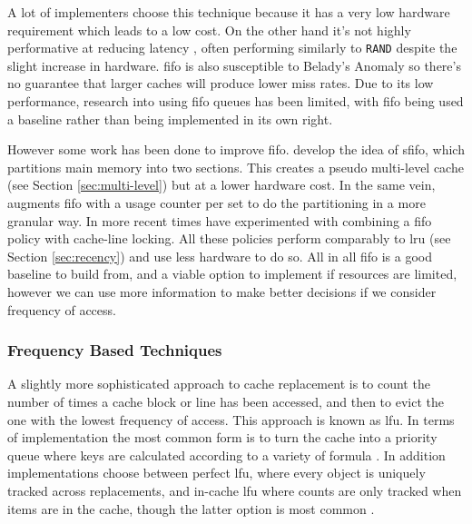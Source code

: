 A lot of implementers choose this technique because it has a very low hardware requirement \cite{pandaSurveyReplacementStrategies2016} which leads to a low cost. On the other hand it's not highly performative at reducing latency \cite{al-zoubiPerformanceEvaluationCache2004, tsaoMultiFactorPagingExperiment1972}, often performing similarly to \texttt{RAND} despite the slight increase in hardware. \gls{fifo} is also susceptible to Belady's Anomaly \cite{beladyAnomalySpacetimeCharacteristics1969} so there's no guarantee that larger caches will produce lower miss rates. Due to its low performance, research into using \gls{fifo} queues has been limited, with \gls{fifo} being used a baseline \cite{faresPerformanceEvaluationTraditional2012} rather than being implemented in its own right.

However some work has been done to improve \gls{fifo}. \citet{turnerSegmentedFIFOPage1981} develop the idea of \gls{sfifo}, which partitions main memory into two sections. This creates a pseudo multi-level cache (see Section \ref{sec:multi-level}) but at a lower hardware cost. In the same vein, \citet{devilleLowcostUsagebasedReplacement1990} augments \gls{fifo} with a usage counter per set to do the partitioning in a more granular way. In more recent times \citet{wei-chetsengPRRLowoverheadCache2012} have experimented with combining a \gls{fifo} policy with cache-line locking. All these policies perform comparably to \gls{lru} (see Section \ref{sec:recency}) and use less hardware to do so. All in all \gls{fifo} is a good baseline to build from, and a viable option to implement if resources are limited, however we can use more information to make better decisions if we consider frequency of access. 

\subsubsection{Frequency Based Techniques}

A slightly more sophisticated approach to cache replacement is to count the number of times a cache block or line has been accessed, and then to evict the one with the lowest frequency of access. This approach is known as \gls{lfu}. In terms of implementation the most common form is to turn the cache into a priority queue where keys are calculated according to a variety of formula \cite{podlipnigSurveyWebCache2003}. In addition implementations choose between perfect \gls{lfu}, where every object is uniquely tracked across replacements, and in-cache \gls{lfu} where counts are only tracked when items are in the cache, though the latter option is most common \cite{podlipnigSurveyWebCache2003}.

